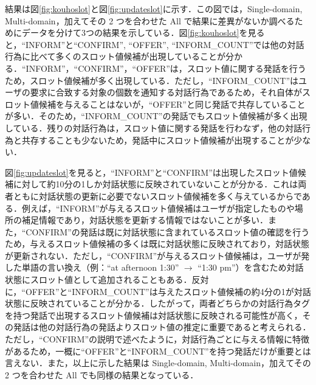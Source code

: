 結果は図\ref{fig:kouhoslot}と図\ref{fig:updateslot}に示す．この図では，Single-domain, Multi-domain，加えてその 2 つを合わせた All で結果に差異がないか調べるためにデータを分けて3つの結果を示している．図\ref{fig:kouhoslot}を見ると，“INFORM”と“CONFIRM”, “OFFER”, “INFORM\_COUNT”では他の対話行為に比べて多くのスロット値候補が出現していることが分かる．“INFORM”，“CONFIRM”，“OFFER”は，スロット値に関する発話を行うため，スロット値候補が多く出現している．ただし，“INFORM\_COUNT”はユーザの要求に合致する対象の個数を通知する対話行為であるため，それ自体がスロット値候補を与えることはないが，“OFFER”と同じ発話で共存していることが多い．そのため，“INFORM\_COUNT”の発話でもスロット値候補が多く出現している．残りの対話行為は，スロット値に関する発話を行わなず，他の対話行為と共存することも少ないため，発話中にスロット値候補が出現することが少ない．
\par
図\ref{fig:updateslot}を見ると，“INFORM”と“CONFIRM”は出現したスロット値候補に対して約10分の1しか対話状態に反映されていないことが分かる．これは両者ともに対話状態の更新に必要でないスロット値候補を多く与えているからである．例えば，“INFORM”が与えるスロット値候補はユーザが指定したものや場所の補足情報であり，対話状態を更新する情報ではないことが多い．また，“CONFIRM”の発話は既に対話状態に含まれているスロット値の確認を行うため，与えるスロット値候補の多くは既に対話状態に反映されており，対話状態が更新されない．ただし，“CONFIRM”が与えるスロット値候補は，ユーザが発した単語の言い換え（例：“at afternoon 1:30” $\rightarrow$ “1:30 pm”）を含むため対話状態にスロット値として追加されることもある．反対に，“OFFER”と“INFORM\_COUNT”は与えたスロット値候補の約4分の1が対話状態に反映されていることが分かる．したがって，両者どちらかの対話行為タグを持つ発話で出現するスロット値候補は対話状態に反映される可能性が高く，その発話は他の対話行為の発話よりスロット値の推定に重要であると考えられる．ただし，“CONFIRM”の説明で述べたように，対話行為ごとに与える情報に特徴があるため，一概に“OFFER”と“INFORM\_COUNT”を持つ発話だけが重要とは言えない．また，以上に示した結果は Single-domain, Multi-domain，加えてその 2 つを合わせた All でも同様の結果となっている．